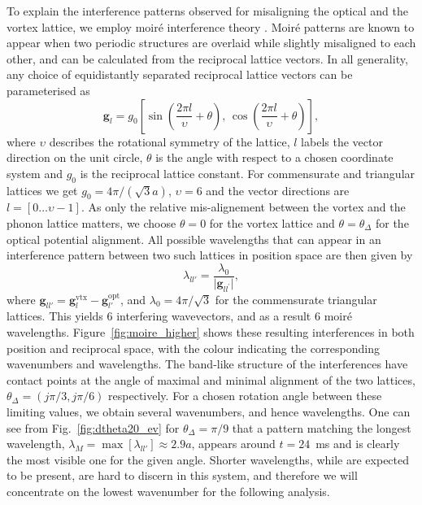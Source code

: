     To explain the interference patterns observed for misaligning the optical and the vortex lattice, we employ moir\'e interference theory \cite{SS:Hermann_jpcm_2012}. Moir\'e patterns are known to appear when two periodic structures are overlaid while slightly misaligned to each other, and can be calculated from the reciprocal lattice vectors. In all generality, any choice of equidistantly separated reciprocal lattice vectors can be parameterised as
    	\begin{equation}
    		\mathbf{g}_{l} = g_0 \left[ \sin\left( \frac{2\pi l}{\upsilon}+\theta \right),\, \cos\left( \frac{2\pi l}{\upsilon} +\theta\right) \right],
    	\end{equation}
    where $\upsilon$ describes the rotational symmetry of the lattice, $l$ labels the vector direction on the unit circle, $\theta$ is the angle with respect to a chosen coordinate system and $g_0$ is the reciprocal lattice constant. For commensurate and triangular lattices we get $g_0=4\pi/(\sqrt{3}a)$, $\upsilon=6$ and the vector directions are $l=\left[0\dots\upsilon-1\right]$. As only the relative mis-alignement between the vortex and the phonon lattice matters, we choose $\theta=0$ for the vortex lattice and $\theta=\theta_\Delta$ for the optical potential alignment.
    All possible wavelengths that can appear in an interference pattern between two such lattices in position space are then given by
    	\begin{equation}
    		\lambda_{ll'} = \frac{\lambda_0}{|{\mathbf{g}_{ll^\prime}|}},
    		\label{eq:InterferenceVectors}
    	\end{equation}
    where
    $\mathbf{g}_{ll'}=\mathbf{g}_{l}^{\text{vtx}}-\mathbf{g}_{l'}^{\text{opt}}$, and
    $\lambda_0 = 4\pi/\sqrt{3}$ for the commensurate triangular lattices. This yields 6 interfering wavevectors, and as a result 6 moir\'e wavelengths. Figure~\ref{fig:moire_higher} shows these resulting interferences in both position and reciprocal space, with the colour indicating the corresponding wavenumbers and wavelengths. The band-like structure of the interferences have contact points at the angle of maximal and minimal alignment of the two lattices, $\theta_\Delta=(j\pi/3,j\pi/6)$ respectively. For a chosen rotation angle between these limiting values, we obtain several wavenumbers, and hence wavelengths. One can see from Fig.~\ref{fig:dtheta20_ev} for $\theta_\Delta = \pi/9$ that a pattern matching the longest wavelength, $\lambda_M= \max[\lambda_{ll'}] \approx 2.9 a$, appears around $t=24$~ms and is clearly the most visible one for the given angle. Shorter wavelengths, while are expected to be present, are hard to discern in this system, and therefore we will concentrate on the lowest wavenumber for the following analysis.

